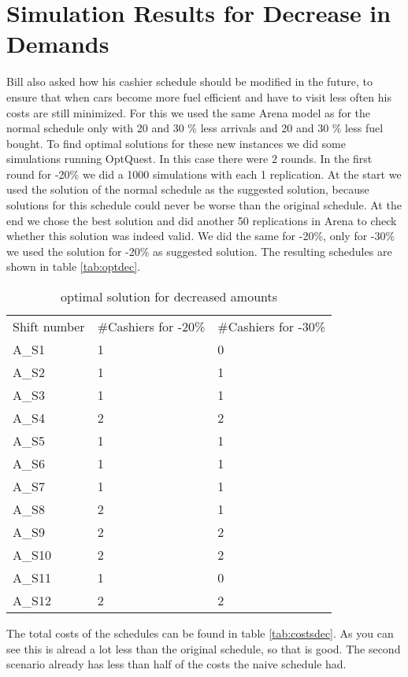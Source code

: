 \section{Simulation Results for Decrease in Demands}\label{app:demands}
Bill also asked how his cashier schedule should be modified in the future, to ensure that when cars become more fuel efficient and have to visit less often his costs are still minimized. 
For this we used the same Arena model as for the normal schedule only with 20 and 30 \% less arrivals and 20 and 30 \% less fuel bought. 
To find optimal solutions for these new instances we did some simulations running OptQuest. 
In this case there were 2 rounds.
In the first round for -20\% we did a 1000 simulations with each 1 replication. 
At the start we used the solution of the normal schedule as the suggested solution, because solutions for this schedule could never be worse than the original schedule.
At the end we chose the best solution and did another 50 replications in Arena to check whether this solution was indeed valid. 
We did the same for -20\%, only for -30\% we used the solution for -20\% as suggested solution.
The resulting schedules are shown in table \autoref{tab:optdec}.

\begin{table}[h!]
	\centering
	\begin{tabular}{l | l | l }
		Shift number & \#Cashiers for -20\% & \#Cashiers for -30\% \\
		A\_S1 & 1 & 0\\
		A\_S2 & 1 & 1\\
		A\_S3 & 1 & 1\\
		A\_S4 & 2 & 2\\
		A\_S5 & 1 & 1\\
		A\_S6 & 1 & 1\\
		A\_S7 & 1 & 1\\
		A\_S8 & 2 & 1\\
		A\_S9 & 2 & 2\\
		A\_S10 & 2 & 2\\
		A\_S11 & 1 & 0\\
		A\_S12 & 2 & 2\\
	\end{tabular}
	\caption{optimal solution for decreased amounts}
	\label{tab:optdec}
\end{table}

The total costs of the schedules can be found in table \autoref{tab:costsdec}. As you can see this is alread a lot less than the original schedule, so that is good. The second scenario already has less than half of the costs the naive schedule had.

